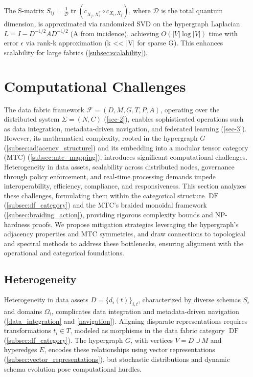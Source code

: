 \documentclass{amsart}
\newcommand\cF{\mathcal{F}}
\DeclareMathOperator\DF{DF}
\DeclareMathOperator\tr{tr}
\begin{document}
The S-matrix \( S_{ij} = \frac{1}{\mathcal{D}} \tr(c_{X_j, X_i^*} \circ c_{X_i, X_j}) \), where \( \mathcal{D} \) is the total quantum dimension, is approximated via randomized SVD on the hypergraph Laplacian \( L = I - D^{-1/2} A D^{-1/2} \) (A from incidence), achieving \( O(|V| \log |V|) \) time with error \( \epsilon \) via rank-k approximation (k << |V| for sparse G). This enhances scalability for large fabrics (\cref{subsec:scalability}).

  


\section{Computational Challenges} \label{sec-6}
%  
The data fabric framework \( \cF = (D, M, G, T, P, A) \), operating over the distributed system \( \Sigma = (N, C) \) (\cref{sec-2}), enables sophisticated operations such as data integration, metadata-driven navigation, and federated learning (\cref{sec-3}). However, its mathematical complexity, rooted in the hypergraph \( G \) (\cref{subsec:adjacency_structure}) and its embedding into a modular tensor category (MTC) (\cref{subsec:mtc_mapping}), introduces significant computational challenges. Heterogeneity in data assets, scalability across distributed nodes, governance through policy enforcement, and real-time processing demands impede interoperability, efficiency, compliance, and responsiveness. This section analyzes these challenges, formulating them within the categorical structure \( \DF \) (\cref{subsec:df_category}) and the MTC’s braided monoidal framework (\cref{subsec:braiding_action}), providing rigorous complexity bounds and NP-hardness proofs. We propose mitigation strategies leveraging the hypergraph’s adjacency properties and MTC symmetries, 
%
and draw connections to topological and spectral methods to address these bottlenecks, ensuring alignment with the operational and categorical foundations.

\subsection{Heterogeneity} \label{subsec:heterogeneity}
%  
Heterogeneity in data assets \( D = \{d_i(t)\}_{i,t} \), characterized by diverse schemas \( S_i \) and domains \( \Omega_i \), complicates data integration and metadata-driven navigation (\cref{data_integration} and \cref{navigation}). Aligning disparate representations requires transformations \( t_i \in T \), modeled as morphisms in the data fabric category \( \DF \) (\cref{subsec:df_category}). The hypergraph \( G \), with vertices \( V = D \cup M \) and hyperedges \( E \), encodes these relationships using vector representations (\cref{subsec:vector_representations}), but stochastic distributions and dynamic schema evolution pose computational hurdles.
\end{document}
